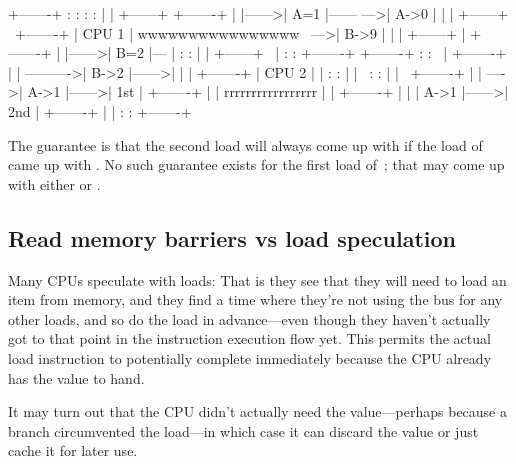 \begin{VerbatimU}
	+-------+       :      :                :       :
	|       |       +------+                +-------+
	|       |------>| A=1  |------      --->| A->0  |
	|       |       +------+      \         +-------+
	| CPU 1 |   wwwwwwwwwwwwwwww   \    --->| B->9  |
	|       |       +------+        |       +-------+
	|       |------>| B=2  |---     |       :       :
	|       |       +------+   \    |       :       :       +-------+
	+-------+       :      :    \   |       +-------+       |       |
	                             ---------->| B->2  |------>|       |
	                                |       +-------+       | CPU 2 |
	                                |       :       :       |       |
	                                 \      :       :       |       |
	                                  \     +-------+       |       |
	                                   ---->| A->1  |------>| 1st   |
	                                        +-------+       |       |
	                                    rrrrrrrrrrrrrrrrr   |       |
	                                        +-------+       |       |
	                                        | A->1  |------>| 2nd   |
	                                        +-------+       |       |
	                                        :       :       +-------+
\end{VerbatimU}

The guarantee is that the second load will always come up with 
if the load of~ came up with .
No such guarantee exists for the first load of~; that may come up with
either  or .


\subsection{Read memory barriers vs load speculation}

Many CPUs speculate with loads:
That is they see that they will need to load an item from memory, and
they find a time where they're not using the bus for any other loads,
and so do the load in advance---even though they haven't actually
got to that point in the instruction execution flow yet.
This permits the actual load instruction to potentially complete
immediately because the CPU already has the value to hand.

It may turn out that the CPU didn't actually need the value---perhaps
because a branch circumvented the load---in which case it can discard
the value or just cache it for later use.

